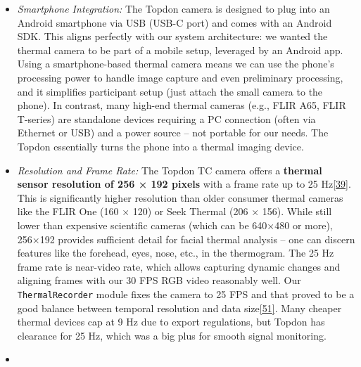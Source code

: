 \documentclass[12pt,a4paper]{article}
\begin{document}
\begin{itemize}
\item
  \emph{Smartphone Integration:} The Topdon camera is designed to plug into an Android smartphone via USB (USB-C port) and comes with an Android SDK. This aligns perfectly with our system architecture: we wanted the thermal camera to be part of a mobile setup, leveraged by an Android app. Using a smartphone-based thermal camera means we can use the phone's processing power to handle image capture and even preliminary processing, and it simplifies participant setup (just attach the small camera to the phone). In contrast, many high-end thermal cameras (e.g., FLIR A65, FLIR T-series) are standalone devices requiring a PC connection (often via Ethernet or USB) and a power source -- not portable for our needs. The Topdon essentially turns the phone into a thermal imaging device.
\item
  \emph{Resolution and Frame Rate:} The Topdon TC camera offers a \textbf{thermal sensor resolution of 256 × 192 pixels} with a frame rate up to 25 Hz\href{https://github.com/buccancs/bucika_gsr/blob/7048f7f6a7536f5cd577ed2184800d3dad97fd08/AndroidApp/src/main/java/com/multisensor/recording/recording/ThermalRecorder.kt\#L53-L61}{{[}39{]}}. This is significantly higher resolution than older consumer thermal cameras like the FLIR One (160 × 120) or Seek Thermal (206 × 156). While still lower than expensive scientific cameras (which can be 640×480 or more), 256×192 provides sufficient detail for facial thermal analysis -- one can discern features like the forehead, eyes, nose, etc., in the thermogram. The 25 Hz frame rate is near-video rate, which allows capturing dynamic changes and aligning frames with our 30 FPS RGB video reasonably well. Our \passthrough{\lstinline!ThermalRecorder!} module fixes the camera to 25 FPS and that proved to be a good balance between temporal resolution and data size\href{https://github.com/buccancs/bucika_gsr/blob/7048f7f6a7536f5cd577ed2184800d3dad97fd08/AndroidApp/src/main/java/com/multisensor/recording/recording/ThermalRecorder.kt\#L50-L58}{{[}51{]}}. Many cheaper thermal devices cap at 9 Hz due to export regulations, but Topdon has clearance for 25 Hz, which was a big plus for smooth signal monitoring.
\item

\end{itemize}
\end{document}
